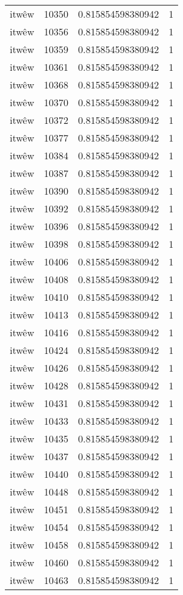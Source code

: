 \begin{longtable}{llll}
itwêw & 10350 & 0.815854598380942 & 1 \\
itwêw & 10356 & 0.815854598380942 & 1 \\
itwêw & 10359 & 0.815854598380942 & 1 \\
itwêw & 10361 & 0.815854598380942 & 1 \\
itwêw & 10368 & 0.815854598380942 & 1 \\
itwêw & 10370 & 0.815854598380942 & 1 \\
itwêw & 10372 & 0.815854598380942 & 1 \\
itwêw & 10377 & 0.815854598380942 & 1 \\
itwêw & 10384 & 0.815854598380942 & 1 \\
itwêw & 10387 & 0.815854598380942 & 1 \\
itwêw & 10390 & 0.815854598380942 & 1 \\
itwêw & 10392 & 0.815854598380942 & 1 \\
itwêw & 10396 & 0.815854598380942 & 1 \\
itwêw & 10398 & 0.815854598380942 & 1 \\
itwêw & 10406 & 0.815854598380942 & 1 \\
itwêw & 10408 & 0.815854598380942 & 1 \\
itwêw & 10410 & 0.815854598380942 & 1 \\
itwêw & 10413 & 0.815854598380942 & 1 \\
itwêw & 10416 & 0.815854598380942 & 1 \\
itwêw & 10424 & 0.815854598380942 & 1 \\
itwêw & 10426 & 0.815854598380942 & 1 \\
itwêw & 10428 & 0.815854598380942 & 1 \\
itwêw & 10431 & 0.815854598380942 & 1 \\
itwêw & 10433 & 0.815854598380942 & 1 \\
itwêw & 10435 & 0.815854598380942 & 1 \\
itwêw & 10437 & 0.815854598380942 & 1 \\
itwêw & 10440 & 0.815854598380942 & 1 \\
itwêw & 10448 & 0.815854598380942 & 1 \\
itwêw & 10451 & 0.815854598380942 & 1 \\
itwêw & 10454 & 0.815854598380942 & 1 \\
itwêw & 10458 & 0.815854598380942 & 1 \\
itwêw & 10460 & 0.815854598380942 & 1 \\
itwêw & 10463 & 0.815854598380942 & 1 \\

\end{longtable}
